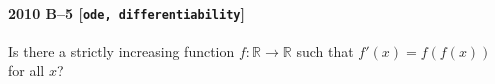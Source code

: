 \paragraph{2010 B--5 \textnormal{[\texttt{ode, differentiability}]}}
Is there a strictly increasing function $f: \mathbb{R} \to \mathbb{R}$ such that $f'(x) = f(f(x))$ for all $x$?
